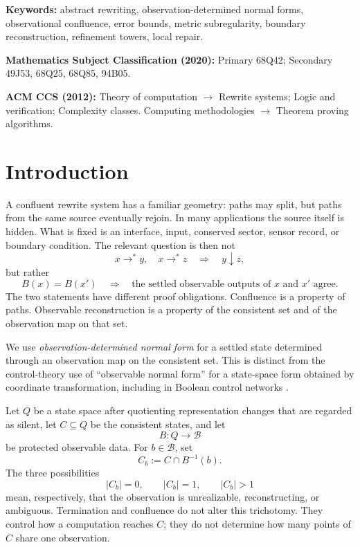 \documentclass[11pt]{article}
\theoremstyle{definition}
\theoremstyle{remark}
\numberwithin{equation}{section}
\newcommand{\cB}{\mathcal B}
\begin{document}
\medskip
\noindent\textbf{Keywords:} abstract rewriting, observation-determined normal forms, observational confluence, error bounds, metric subregularity, boundary reconstruction, refinement towers, local repair.

\noindent\textbf{Mathematics Subject Classification (2020):} Primary 68Q42; Secondary 49J53, 68Q25, 68Q85, 94B05.

\noindent\textbf{ACM CCS (2012):} Theory of computation $\rightarrow$ Rewrite systems; Logic and verification; Complexity classes. Computing methodologies $\rightarrow$ Theorem proving algorithms.

\section{Introduction}\label{sec:intro}

A confluent rewrite system has a familiar geometry: paths may split, but paths from the same source eventually rejoin.  In many applications the source itself is hidden.  What is fixed is an interface, input, conserved sector, sensor record, or boundary condition.  The relevant question is then not
\[
 x\to^*y,\quad x\to^*z\quad\Longrightarrow\quad y\downarrow z,
\]
but rather
\[
 B(x)=B(x')\quad\Longrightarrow\quad
 \text{the settled observable outputs of }x\text{ and }x'\text{ agree}.
\]
The two statements have different proof obligations.  Confluence is a property of paths.  Observable reconstruction is a property of the consistent set and of the observation map on that set.

We use \emph{observation-determined normal form} for a settled state determined
through an observation map on the consistent set.  This is distinct from the
control-theory use of \enquote{observable normal form} for a state-space form
obtained by coordinate transformation, including in Boolean control networks
\citep{ChengLiQi2010}.

Let $Q$ be a state space after quotienting representation changes that are regarded as silent, let $C\subseteq Q$ be the consistent states, and let
\[
 B:Q\longrightarrow\cB
\]
be protected observable data.  For $b\in\cB$, set
\[
 C_b:=C\cap B^{-1}(b).
\]
The three possibilities
\[
 |C_b|=0,\qquad |C_b|=1,\qquad |C_b|>1
\]
mean, respectively, that the observation is unrealizable, reconstructing, or ambiguous.  Termination and confluence do not alter this trichotomy.  They control how a computation reaches $C$; they do not determine how many points of $C$ share one observation.
\end{document}
